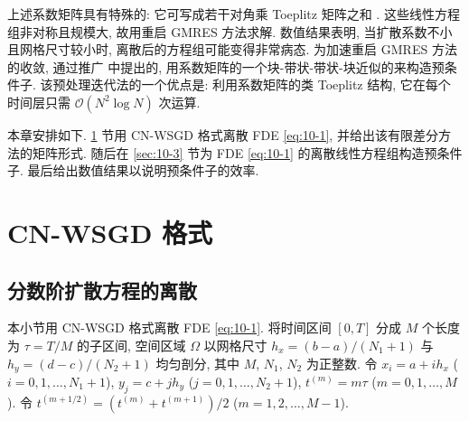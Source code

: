上述系数矩阵具有特殊的: 它可写成若干对角乘 Toeplitz 矩阵之和 \cite{src:46,src:79,src:90}. 这些线性方程组非对称且规模大, 故用重启 GMRES 方法求解. 数值结果表明, 当扩散系数不小且网格尺寸较小时, 离散后的方程组可能变得非常病态. 为加速重启 GMRES 方法的收敛, 通过推广 \cite{src:59} 中提出的, 用系数矩阵的一个块-带状-带状-块近似的来构造预条件子. 该预处理迭代法的一个优点是: 利用系数矩阵的类 Toeplitz 结构, 它在每个时间层只需 $\mathcal{O}(N^{2}\log N)$ 次运算.

本章安排如下. \ref{sec:10-2} 节用 CN-WSGD 格式离散 FDE \eqref{eq:10-1}, 并给出该有限差分方法的矩阵形式. 随后在 \ref{sec:10-3} 节为 FDE \eqref{eq:10-1} 的离散线性方程组构造预条件子. 最后给出数值结果以说明预条件子的效率.

\section{CN-WSGD 格式}
\label{sec:10-2}

\subsection{分数阶扩散方程的离散}
\label{sec:10-2-1}

本小节用 CN-WSGD 格式离散 FDE \eqref{eq:10-1}. 将时间区间 $[0,T]$ 分成 $M$ 个长度为 $\tau=T/M$ 的子区间, 空间区域 $\Omega$ 以网格尺寸 $h_{x}=(b-a)/(N_{1}+1)$ 与 $h_{y}=(d-c)/(N_{2}+1)$ 均匀剖分, 其中 $M$, $N_{1}$, $N_{2}$ 为正整数. 令 $x_{i}=a+ih_{x}$ ($i=0,1,\ldots,N_{1}+1$), $y_{j}=c+jh_{y}$ ($j=0,1,\ldots,N_{2}+1$), $t^{(m)}=m\tau$ ($m=0,1,\ldots,M$). 令 $t^{(m+1/2)}=(t^{(m)}+t^{(m+1)})/2$ ($m=1,2,\ldots,M-1$).

